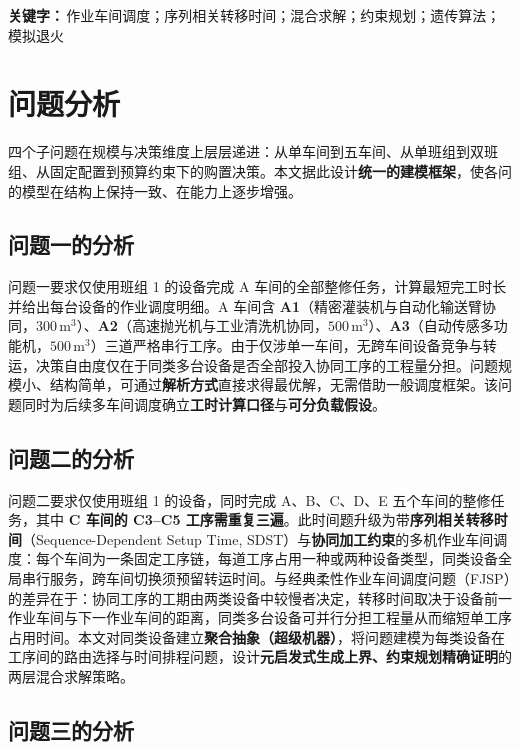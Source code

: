 \documentclass[12pt,a4paper]{ctexart}
\begin{document}
\noindent\textbf{关键字：}\,作业车间调度；序列相关转移时间；混合求解；约束规划；遗传算法；模拟退火

\section{问题分析}

四个子问题在规模与决策维度上层层递进：从单车间到五车间、从单班组到双班组、从固定配置到预算约束下的购置决策。本文据此设计\textbf{统一的建模框架}，使各问的模型在结构上保持一致、在能力上逐步增强。

\subsection{问题一的分析}

问题一要求仅使用班组 1 的设备完成 A 车间的全部整修任务，计算最短完工时长并给出每台设备的作业调度明细。A 车间含 \textbf{A1}（精密灌装机与自动化输送臂协同，$300\,\mathrm{m}^3$）、\textbf{A2}（高速抛光机与工业清洗机协同，$500\,\mathrm{m}^3$）、\textbf{A3}（自动传感多功能机，$500\,\mathrm{m}^3$）三道严格串行工序。由于仅涉单一车间，无跨车间设备竞争与转运，决策自由度仅在于同类多台设备是否全部投入协同工序的工程量分担。问题规模小、结构简单，可通过\textbf{解析方式}直接求得最优解，无需借助一般调度框架。该问题同时为后续多车间调度确立\textbf{工时计算口径}与\textbf{可分负载假设}。

\subsection{问题二的分析}

问题二要求仅使用班组 1 的设备，同时完成 A、B、C、D、E 五个车间的整修任务，其中 \textbf{C 车间的 C3--C5 工序需重复三遍}。此时间题升级为带\textbf{序列相关转移时间}（Sequence-Dependent Setup Time, SDST）与\textbf{协同加工约束}的多机作业车间调度：每个车间为一条固定工序链，每道工序占用一种或两种设备类型，同类设备全局串行服务，跨车间切换须预留转运时间。与经典柔性作业车间调度问题（FJSP）的差异在于：协同工序的工期由两类设备中较慢者决定，转移时间取决于设备前一作业车间与下一作业车间的距离，同类多台设备可并行分担工程量从而缩短单工序占用时间。本文对同类设备建立\textbf{聚合抽象（超级机器）}，将问题建模为每类设备在工序间的路由选择与时间排程问题，设计\textbf{元启发式生成上界、约束规划精确证明}的两层混合求解策略。

\subsection{问题三的分析}
\end{document}

